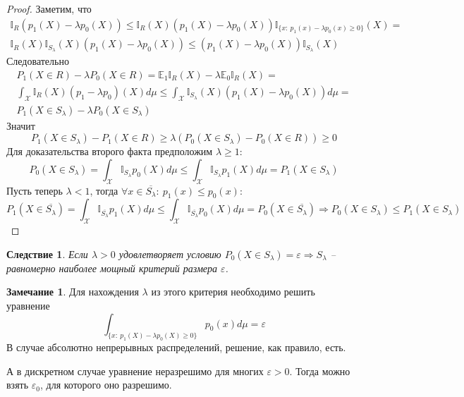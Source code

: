 \documentclass[a4paper,12pt]{article}
\renewcommand{\leq}{\ensuremath{\leqslant}}
\renewcommand{\geq}{\ensuremath{\geqslant}}
\theoremstyle{plain}
\newtheorem*{corollary}{Следствие}
\theoremstyle{definition}
\newtheorem*{note}{Замечание}
\theoremstyle{remark}
\begin{document}
\begin{proof}
  Заметим, что
  \begin{align*}
    \mathbb{I}_R(p_1(X) - \lambda p_0(X)) \leq \mathbb{I}_R(X)(p_1(X) - \lambda p_0(X))\mathbb{I}_{\{x :\: p_1(x) - \lambda p_0(x) \geq 0\}}(X) =\\
    \mathbb{I}_R(X)\mathbb{I}_{S_\lambda}(X)(p_1(X) - \lambda p_0(X)) \leq (p_1(X) - \lambda p_0(X))\mathbb{I}_{S_\lambda}(X)
  \end{align*}
  Следовательно
  \begin{align*}
    P_1(X \in R) - \lambda P_0(X \in R) = \mathbb{E}_1\mathbb{I}_R(X) - \lambda\mathbb{E}_0\mathbb{I}_R(X) =\\
    \int_\mathcal{X}\mathbb{I}_R(X)(p_1 - \lambda p_0)(X)d\mu \leq \int_\mathcal{X}\mathbb{I}_{S_\lambda}(X)(p_1(X) - \lambda p_0(X))d\mu =\\
    P_1(X \in S_\lambda) - \lambda P_0(X \in S_\lambda)
  \end{align*}
  Значит
  \[
    P_1(X \in S_\lambda) - P_1(X \in R) \geq \lambda(P_0(X \in S_\lambda) - P_0(X \in R)) \geq 0
  \]
  Для доказательства второго факта предположим $\lambda \geq 1$:
  \[
    P_0(X \in S_\lambda) = \int_\mathcal{X}\mathbb{I}_{S_\lambda}p_0(X)d\mu \leq \int_\mathcal{X}\mathbb{I}_{S_\lambda}p_1(X)d\mu = P_1(X \in S_\lambda)
  \]
  Пусть теперь $\lambda < 1$, тогда $\forall x \in \overline{S_\lambda} :\: p_1(x) \leq p_0(x)$:
  \[
    P_1(X \in \overline{S_\lambda}) = \int_\mathcal{X}\mathbb{I}_{\overline{S_\lambda}}p_1(X)d\mu \leq \int_\mathcal{X}\mathbb{I}_{\overline{S_\lambda}}p_0(X)d\mu = P_0(X \in \overline{S_\lambda}) \Rightarrow P_0(X \in S_\lambda) \leq P_1(X \in S_\lambda)
  \]
\end{proof}

\begin{corollary}
  Если $\lambda > 0$ удовлетворяет условию $P_0(X \in S_\lambda) = \varepsilon \Rightarrow S_\lambda$ -- равномерно наиболее мощный критерий размера $\varepsilon$.
\end{corollary}

\begin{note}
  Для нахождения $\lambda$ из этого критерия необходимо решить уравнение
  \[
    \int_{\{x :\: p_1(X) - \lambda p_0(X) \geq 0\}}p_0(x)d\mu = \varepsilon
  \]
  В случае абсолютно непрерывных распределений, решение, как правило, есть.

  А в дискретном случае уравнение неразрешимо для многих $\varepsilon > 0$. Тогда можно взять $\varepsilon_0$, для которого оно разрешимо.
\end{note}
\end{document}

